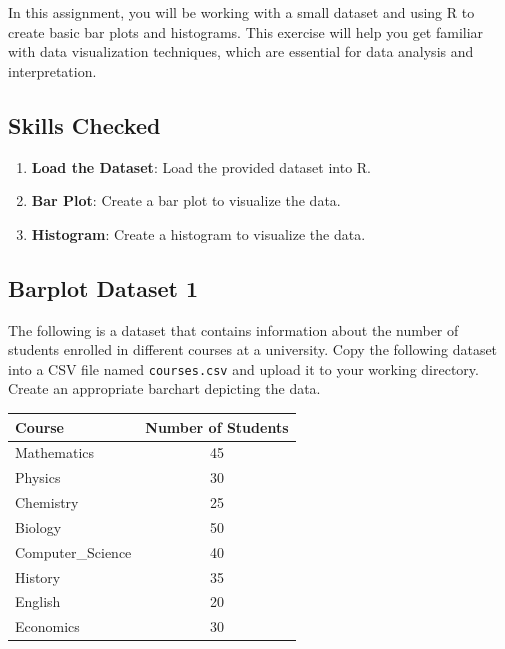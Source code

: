 \documentclass[
  letterpaper,
  DIV=11,
  numbers=noendperiod]{scrreprt}
\providecommand{\tightlist}{%
  \setlength{\itemsep}{0pt}\setlength{\parskip}{0pt}}\usepackage{longtable,booktabs,array}
\begin{document}

In this assignment, you will be working with a small dataset and using R
to create basic bar plots and histograms. This exercise will help you
get familiar with data visualization techniques, which are essential for
data analysis and interpretation.

\subsection*{Skills Checked}\label{skills-checked}

\begin{enumerate}
\def\labelenumi{\arabic{enumi}.}
\tightlist
\item
  \textbf{Load the Dataset}: Load the provided dataset into R.
\item
  \textbf{Bar Plot}: Create a bar plot to visualize the data.
\item
  \textbf{Histogram}: Create a histogram to visualize the data.
\end{enumerate}

\subsection*{Barplot Dataset 1}\label{barplot-dataset-1}

The following is a dataset that contains information about the number of
students enrolled in different courses at a university. Copy the
following dataset into a CSV file named \texttt{courses.csv} and upload
it to your working directory. Create an appropriate barchart depicting
the data.

\begin{longtable}[]{@{}lc@{}}
\toprule\noalign{}
Course & Number of Students \\
\midrule\noalign{}
\endhead
\bottomrule\noalign{}
\endlastfoot
Mathematics & 45 \\
Physics & 30 \\
Chemistry & 25 \\
Biology & 50 \\
Computer\_Science & 40 \\
History & 35 \\
English & 20 \\
Economics & 30 \\
\end{longtable}
\end{document}
